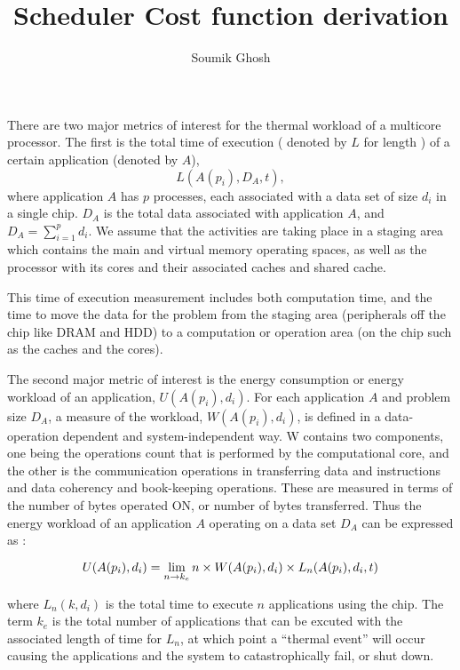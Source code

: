\documentclass{amsart}
\begin{document}
\title{Scheduler Cost function derivation}\author{Soumik Ghosh\\
}\maketitle

There are two major metrics of interest for the thermal workload of a
multicore processor. The first is the total time of execution ( denoted by $L$
for length ) of a certain application (denoted by $A$),
\[ L (A (p_i), D_A, t), \]
where application $A$ has $p$ processes, each associated with a data set of
size $d_i$ in a single chip. $D_A$ is the total data associated with
application $A$, and $D_A = \sum_{i = 1}^p d_i$. We assume that the activities
are taking place in a staging area which contains the main and virtual memory
operating spaces, as well as the processor with its cores and their associated
caches and shared cache.

This time of execution measurement includes both computation time, and the
time to move the data for the problem from the staging area (peripherals off
the chip like DRAM and HDD) to a computation or operation area (on the chip
such as the caches and the cores).

The second major metric of interest is the energy consumption or energy
workload of an application, $U (A (p_i), d_i)$. For each application $A$ and
problem size $D_A$, a measure of the workload, $W (A (p_i), d_i)$, is defined
in a data-operation dependent and system-independent way. W contains two
components, one being the operations count that is performed by the
computational core, and the other is the communication operations in
transferring data and instructions and data coherency and book-keeping
operations. These are measured in terms of the number of bytes operated ON, or
number of bytes transferred. Thus the energy workload of an application $A$
operating on a data set $D_A$ can be expressed as :

\[ U (A (p_i), d_i) = \lim_{n \to k_e} n \times W (A (p_i), d_i) \times L_n (A
   (p_i), d_i, t) \\
   \]

where $L_n (k, d_i)$ is the total time to execute $n$ applications using the
chip. The term $k_e$ is the total number of applications that can be excuted
with the associated length of time for $L_n$, at which point a ``thermal
event'' will occur causing the applications and the system to catastrophically
fail, or shut down.
\end{document}
